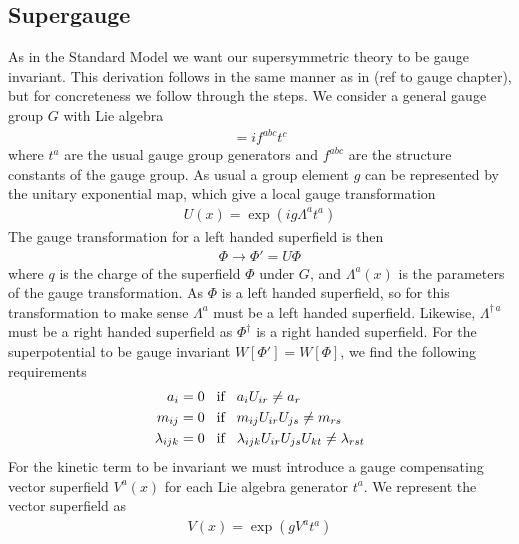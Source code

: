 \subsection{Supergauge}
As in the Standard Model we want our supersymmetric theory to be gauge invariant. This derivation follows in the same manner as in (ref to gauge chapter), but for concreteness we follow through the steps. We consider a general gauge group $G$ with Lie algebra
\begin{align}
    [t^{a},t^{b}]=if^{abc}t^{c}
\end{align}
where $t^{a}$ are the usual gauge group generators and $f^{abc}$ are the structure constants of the gauge group. As usual a group element $g$ can be represented by the unitary exponential map, which give a local gauge transformation
\begin{align}\label{eq:supergauge}
    U(x)=\exp(ig\Lambda^{a}t^{a})
\end{align}
The gauge transformation for a left handed superfield is then
\begin{align}
    \Phi\rightarrow\Phi'=U\Phi
\end{align}
where $q$ is the charge of the superfield $\Phi$ under $G$, and $\Lambda^{a}(x)$ is the parameters of the gauge transformation. As $\Phi$ is a left handed superfield, so for this transformation to make sense $\Lambda^{a}$ must be a left handed superfield. Likewise, $\Lambda^{\dagger\,a}$ must be a right handed superfield as $\Phi^{\dagger}$ is a right handed superfield. For the superpotential to be gauge invariant $W[\Phi']=W[\Phi]$, we find the following requirements
\begin{align}
    a_{i}&=0\hspace{3mm}\text{if}\hspace{3mm} a_{i}U_{ir}\neq a_{r}
    \\
    m_{ij}&=0\hspace{3mm}\text{if}\hspace{3mm} m_{ij}U_{ir}U_{js}\neq m_{rs}
    \\
    \lambda_{ijk}&=0\hspace{3mm}\text{if}\hspace{3mm} \lambda_{ijk}U_{ir}U_{js}U_{kt}\neq \lambda_{rst}
\end{align}
For the kinetic term to be invariant we must introduce a gauge compensating vector superfield $V^{a}(x)$ for each Lie algebra generator $t^{a}$. We represent the vector superfield as
\begin{align}
    V(x)=\exp(gV^{a}t^{a})
\end{align}
